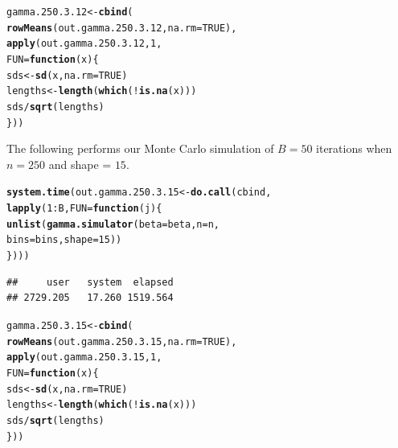 \documentclass[11pt]{article}\usepackage[]{graphicx}\usepackage[]{color}
\makeatletter
\newcommand{\hlnum}[1]{\textcolor[rgb]{0.686,0.059,0.569}{#1}}%
\newcommand{\hlopt}[1]{\textcolor[rgb]{0,0,0}{#1}}%
\newcommand{\hlstd}[1]{\textcolor[rgb]{0.345,0.345,0.345}{#1}}%
\newcommand{\hlkwa}[1]{\textcolor[rgb]{0.161,0.373,0.58}{\textbf{#1}}}%
\newcommand{\hlkwb}[1]{\textcolor[rgb]{0.69,0.353,0.396}{#1}}%
\newcommand{\hlkwc}[1]{\textcolor[rgb]{0.333,0.667,0.333}{#1}}%
\newcommand{\hlkwd}[1]{\textcolor[rgb]{0.737,0.353,0.396}{\textbf{#1}}}%
\newenvironment{kframe}{%
 \def\at@end@of@kframe{}%
 \ifinner\ifhmode%
  \def\at@end@of@kframe{\end{minipage}}%
  \begin{minipage}{\columnwidth}%
 \fi\fi%
 \def\FrameCommand##1{\hskip\@totalleftmargin \hskip-\fboxsep
 \colorbox{shadecolor}{##1}\hskip-\fboxsep
     \hskip-\linewidth \hskip-\@totalleftmargin \hskip\columnwidth}%
 \MakeFramed {\advance\hsize-\width
   \@totalleftmargin\z@ \linewidth\hsize
   \@setminipage}}%
 {\par\unskip\endMakeFramed%
 \at@end@of@kframe}
\newenvironment{knitrout}{}{} %
\makeatother
\begin{document}
\begin{knitrout}
\color{fgcolor}\begin{kframe}
\begin{alltt}
\hlstd{gamma.250.3.12} \hlkwb{<-} \hlkwd{cbind}\hlstd{(}
  \hlkwd{rowMeans}\hlstd{(out.gamma.250.3.12,} \hlkwc{na.rm} \hlstd{=} \hlnum{TRUE}\hlstd{),}
  \hlkwd{apply}\hlstd{(out.gamma.250.3.12,} \hlnum{1}\hlstd{,}
  \hlkwc{FUN} \hlstd{=} \hlkwa{function}\hlstd{(}\hlkwc{x}\hlstd{)\{}
    \hlstd{sds} \hlkwb{<-} \hlkwd{sd}\hlstd{(x,} \hlkwc{na.rm} \hlstd{=} \hlnum{TRUE}\hlstd{)}
    \hlstd{lengths} \hlkwb{<-} \hlkwd{length}\hlstd{(}\hlkwd{which}\hlstd{(}\hlopt{!}\hlkwd{is.na}\hlstd{(x)))}
    \hlstd{sds} \hlopt{/} \hlkwd{sqrt}\hlstd{(lengths)}
  \hlstd{\}))}
\end{alltt}
\end{kframe}
\end{knitrout}

The following performs our Monte Carlo simulation of $B = 50$ iterations 
when $n = 250$ and shape = $15$.

\begin{knitrout}
\color{fgcolor}\begin{kframe}
\begin{alltt}
\hlkwd{system.time}\hlstd{(out.gamma.250.3.15} \hlkwb{<-} \hlkwd{do.call}\hlstd{(cbind,}
  \hlkwd{lapply}\hlstd{(}\hlnum{1}\hlopt{:}\hlstd{B,} \hlkwc{FUN} \hlstd{=} \hlkwa{function}\hlstd{(}\hlkwc{j}\hlstd{)\{}
    \hlkwd{unlist}\hlstd{(}\hlkwd{gamma.simulator}\hlstd{(}\hlkwc{beta} \hlstd{= beta,} \hlkwc{n} \hlstd{= n,}
      \hlkwc{bins} \hlstd{= bins,} \hlkwc{shape} \hlstd{=} \hlnum{15}\hlstd{))}
\hlstd{\})))}
\end{alltt}
\begin{verbatim}
##     user   system  elapsed 
## 2729.205   17.260 1519.564
\end{verbatim}
\end{kframe}
\end{knitrout}

\begin{knitrout}
\color{fgcolor}\begin{kframe}
\begin{alltt}
\hlstd{gamma.250.3.15} \hlkwb{<-} \hlkwd{cbind}\hlstd{(}
  \hlkwd{rowMeans}\hlstd{(out.gamma.250.3.15,} \hlkwc{na.rm} \hlstd{=} \hlnum{TRUE}\hlstd{),}
  \hlkwd{apply}\hlstd{(out.gamma.250.3.15,} \hlnum{1}\hlstd{,}
  \hlkwc{FUN} \hlstd{=} \hlkwa{function}\hlstd{(}\hlkwc{x}\hlstd{)\{}
    \hlstd{sds} \hlkwb{<-} \hlkwd{sd}\hlstd{(x,} \hlkwc{na.rm} \hlstd{=} \hlnum{TRUE}\hlstd{)}
    \hlstd{lengths} \hlkwb{<-} \hlkwd{length}\hlstd{(}\hlkwd{which}\hlstd{(}\hlopt{!}\hlkwd{is.na}\hlstd{(x)))}
    \hlstd{sds} \hlopt{/} \hlkwd{sqrt}\hlstd{(lengths)}
  \hlstd{\}))}
\end{alltt}
\end{kframe}
\end{knitrout}
\end{document}
